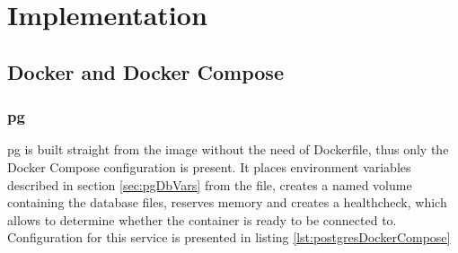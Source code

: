 
\chapter{Implementation}

%
%
\section{Docker and Docker Compose}
\subsection{\acrlong{pg}}
\acrlong{pg} is built straight from the image without the need of Dockerfile, thus only the Docker Compose configuration is present. It places environment variables described in section \ref{sec:pgDbVars} from the file, creates a named volume containing the database files, reserves memory and creates a healthcheck, which allows to determine whether the container is ready to be connected to. Configuration for this service is presented in listing \ref{lst:postgresDockerCompose}


